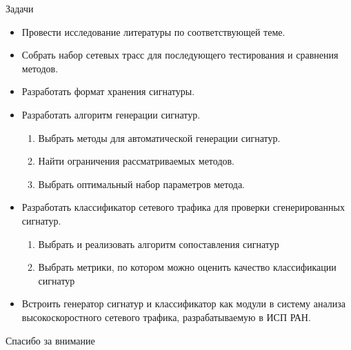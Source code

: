 \documentclass[10pt]{beamer}
\begin{document}
\begin{frame}{Задачи}
    \begin{itemize}
        \item Провести исследование литературы по соответствующей теме.
        \item Собрать набор сетевых трасс для последующего тестирования и сравнения методов.
        \item Разработать формат хранения сигнатуры.
        \item Разработать алгоритм генерации сигнатур.
        \begin{enumerate}
            \item Выбрать методы для автоматической генерации сигнатур.
            \item Найти ограничения рассматриваемых методов.
            \item Выбрать оптимальный набор параметров метода.
        \end{enumerate}
        \item Разработать классификатор сетевого трафика для проверки сгенерированных сигнатур.
        \begin{enumerate}
            \item Выбрать и реализовать алгоритм сопоставления сигнатур
            \item Выбрать метрики, по котором можно оценить качество классификации сигнатур
        \end{enumerate}
        \item Встроить генератор сигнатур и классификатор как модули в систему анализа высокоскоростного сетевого трафика, разрабатываемую в ИСП РАН.
    \end{itemize}
\end{frame}

\appendix

\begin{frame}[standout] \vfill Спасибо за внимание \vfill \end{frame}
\end{document}
